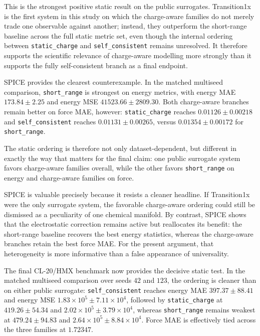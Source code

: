 This is the strongest positive static result on the public surrogates. Transition1x is the first system in this study on which the charge-aware families do not merely trade one observable against another; instead, they outperform the short-range baseline across the full static metric set, even though the internal ordering between \texttt{static\_charge} and \texttt{self\_consistent} remains unresolved. It therefore supports the scientific relevance of charge-aware modelling more strongly than it supports the fully self-consistent branch as a final endpoint.

SPICE provides the clearest counterexample. In the matched multiseed comparison, \texttt{short\_range} is strongest on energy metrics, with energy MAE $173.84 \pm 2.25$ and energy MSE $41523.66 \pm 2809.30$. Both charge-aware branches remain better on force MAE, however: \texttt{static\_charge} reaches $0.01126 \pm 0.00218$ and \texttt{self\_consistent} reaches $0.01131 \pm 0.00265$, versus $0.01354 \pm 0.00172$ for \texttt{short\_range}.

The static ordering is therefore not only dataset-dependent, but different in exactly the way that matters for the final claim: one public surrogate system favors charge-aware families overall, while the other favors \texttt{short\_range} on energy and charge-aware families on force.

SPICE is valuable precisely because it resists a cleaner headline. If Transition1x were the only surrogate system, the favorable charge-aware ordering could still be dismissed as a peculiarity of one chemical manifold. By contrast, SPICE shows that the electrostatic correction remains active but reallocates its benefit: the short-range baseline recovers the best energy statistics, whereas the charge-aware branches retain the best force MAE. For the present argument, that heterogeneity is more informative than a false appearance of universality.

The final CL-20/HMX benchmark now provides the decisive static test. In the matched multiseed comparison over seeds $42$ and $123$, the ordering is cleaner than on either public surrogate: \texttt{self\_consistent} reaches energy MAE $397.37 \pm 88.41$ and energy MSE $1.83 \times 10^{5} \pm 7.11 \times 10^{4}$, followed by \texttt{static\_charge} at $419.26 \pm 54.34$ and $2.02 \times 10^{5} \pm 3.79 \times 10^{4}$, whereas \texttt{short\_range} remains weakest at $479.24 \pm 94.83$ and $2.64 \times 10^{5} \pm 8.84 \times 10^{4}$. Force MAE is effectively tied across the three families at $1.72347$.

